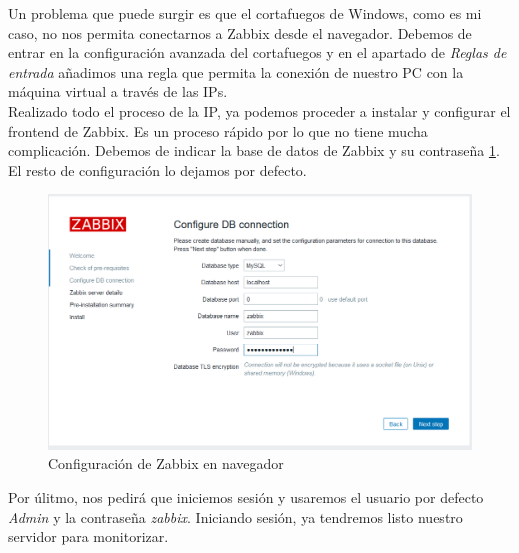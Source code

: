 Un problema que puede surgir es que el cortafuegos de Windows, como es mi caso, no nos permita conectarnos a Zabbix desde el navegador. Debemos de entrar en la configuración avanzada del cortafuegos y en el apartado de \textit{Reglas de entrada} añadimos una regla que permita la conexión de nuestro PC con la máquina virtual a través de las IPs.\\

Realizado todo el proceso de la IP, ya podemos proceder a instalar y configurar el frontend de Zabbix. Es un proceso rápido por lo que no tiene mucha complicación. Debemos de indicar la base de datos de Zabbix y su contraseña \ref{fig:conf-frontend}. El resto de configuración lo dejamos por defecto.

\begin{figure}[H]
  \centering
  \includegraphics[scale=0.6]{Captura12}
  \caption{Configuración de Zabbix en navegador}
  \label{fig:conf-frontend}
\end{figure}

Por úlitmo, nos pedirá que iniciemos sesión y usaremos el usuario por defecto \textit{Admin} y la contraseña \textit{zabbix}. Iniciando sesión, ya tendremos listo nuestro servidor para monitorizar.
